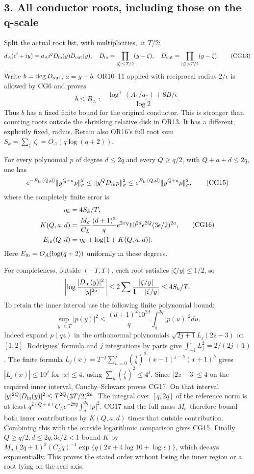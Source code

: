\subsection{3. All conductor roots, including those on the q-scale}\label{all-conductor-roots-including-those-on-the-q-scale}

Split the actual root list, with multiplicities, at \(T/2\): \[
d_A(c'+iy)=a_Ai^g D_{\rm in}(y)D_{\rm out}(y),
\quad D_{\rm in}=\prod_{|\zeta|\le T/2}(y-\zeta),
\quad D_{\rm out}=\prod_{|\zeta|>T/2}(y-\zeta).
\tag{CG13}
\] Write \(b=\deg D_{\rm out}\), \(a=g-b\). OR10--11 applied with reciprocal radius \(2/\epsilon\) is allowed by CG6 and proves \[
b\le B_A:=\frac{\log^+(A_1/a_*)+8B/\epsilon}{\log2}.
\tag{CG14}
\] Thus \(b\) has a fixed finite bound for the original conductor. This is stronger than counting roots outside the shrinking relative disk in OR13. It has a different, explicitly fixed, radius. Retain also OR16's full root sum \(S_k=\sum_\zeta|\zeta|=O_A(q\log(q+2))\).

For every polynomial \(p\) of degree \(d\le2q\) and every \(Q\ge q/2\), with \(Q+a+d\le2q\), one has \[
e^{-E_{\rm in}(Q,d)}\|y^{Q+a}p\|_\sigma^2
\le\|y^QD_{\rm in}p\|_\sigma^2
\le e^{E_{\rm in}(Q,d)}\|y^{Q+a}p\|_\sigma^2,
\tag{CG15}
\] where the completely finite error is \[
\begin{split}
\eta_k&=4S_k/T,\\
K(Q,a,d)&=\frac{M_\sigma}{C_L}\frac{(d+1)^2}{q}
 e^{2\pi q}10^{2d}\epsilon^{2Q}(3\epsilon/2)^{2a},\\
E_{\rm in}(Q,d)&=\eta_k+\log(1+K(Q,a,d)).
\end{split}\tag{CG16}
\] Here \(E_{\rm in}=O_A(\log(q+2))\) uniformly in these degrees.

For completeness, outside \((-T,T)\), each root satisfies \(|\zeta/y|\le1/2\), so \[
\left|\log\frac{|D_{\rm in}(y)|^2}{|y|^{2a}}\right|
\le 2\sum\frac{|\zeta/y|}{1-|\zeta/y|}\le4S_k/T.
\] To retain the inner interval use the following finite polynomial bound: \[
\sup_{|y|\le T}|p(y)|^2
\le\frac{(d+1)^2 10^{2d}}q\int_q^{2q}|p(u)|^2du.
\tag{CG17}
\] Indeed expand \(p(qz)\) in the orthonormal polynomials \(\sqrt{2j+1}L_j(2z-3)\) on \([1,2]\). Rodrigues' formula and \(j\) integrations by parts give \(\int_{-1}^1L_j^2=2/(2j+1)\). The finite formula \(L_j(x)=2^{-j}\sum_{h=0}^j\binom jh^2(x-1)^{j-h}(x+1)^h\) gives \(|L_j(x)|\le10^j\) for \(|x|\le4\), using \(\sum_h\binom jh^2\le4^j\). Since \(|2z-3|\le4\) on the required inner interval, Cauchy--Schwarz proves CG17. On that interval \(|y|^{2Q}|D_{\rm in}(y)|^2\le T^{2Q}(3T/2)^{2a}\). The integral over \([q,2q]\) of the reference norm is at least \(q^{2(Q+a)}C_Le^{-2\pi q}\int_q^{2q}|p|^2\). CG17 and the full mass \(M_\sigma\) therefore bound both inner contributions by \(K(Q,a,d)\) times that outside contribution. Combining this with the outside logarithmic comparison gives CG15. Finally \(Q\ge q/2,d\le2q,3\epsilon/2<1\) bound \(K\) by \(M_\sigma(2q+1)^2(C_Lq)^{-1}
 \exp\{q(2\pi+4\log10+\log\epsilon)\}\), which decays exponentially. This proves the stated order without losing the inner region or a root lying on the real axis.

